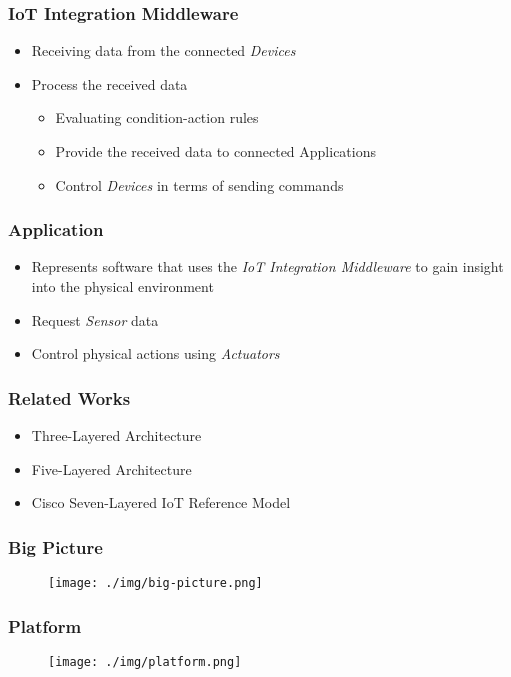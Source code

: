 \documentclass{../iot-lecture}
\begin{document}
\begin{frame}
  \frametitle{IoT Integration Middleware}
  \begin{itemize}
    \item Receiving data from the connected \textit{\color{LimeGreen} Devices}
    \item Process the received data
    \begin{itemize}
      \item Evaluating condition-action rules
      \item Provide the received data to connected Applications
      \item Control \textit{\color{LimeGreen} Devices} in terms of sending commands
    \end{itemize}
  \end{itemize}
\end{frame}

\begin{frame}
  \frametitle{Application}
  \begin{itemize}
    \item Represents software that uses the \textit{\color{TealBlue} IoT Integration Middleware} to gain insight into the physical environment
    \item Request \textit{\color{YellowOrange} Sensor} data
    \item Control physical actions using \textit{\color{RubineRed} Actuators}
  \end{itemize}
\end{frame}

\begin{frame}
  \frametitle{Related Works}
  \begin{itemize}
    \item Three-Layered Architecture
    \item Five-Layered Architecture
    \item Cisco Seven-Layered IoT Reference Model
  \end{itemize}
\end{frame}

\begin{frame}
  \frametitle{Big Picture}
  \begin{figure}
    \texttt{[image: ./img/big-picture.png]}
  \end{figure}
\end{frame}

\begin{frame}
  \frametitle{Platform}
  \begin{figure}
    \texttt{[image: ./img/platform.png]}
  \end{figure}
\end{frame}
\end{document}
